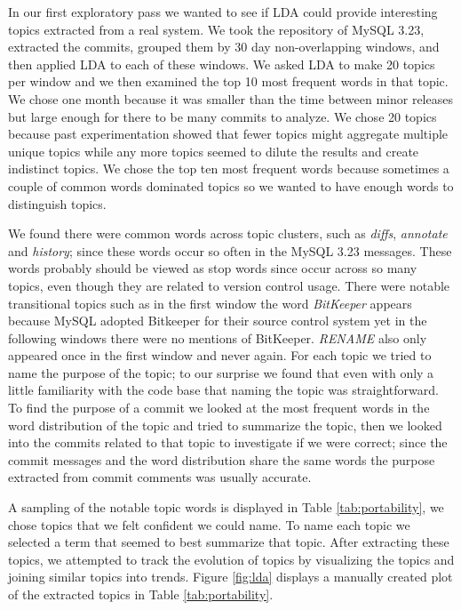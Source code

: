 \documentclass[times, 10pt,twocolumn]{article}
\newcommand{\shrinkit}{\vspace*{-.3em}}
\begin{document}

\shrinkit
{}
\shrinkit

In our first exploratory pass we wanted to see if LDA could provide
interesting topics extracted from a real system. We took the
repository of MySQL 3.23, extracted the commits, grouped them by 30
day non-overlapping windows, and then applied LDA to each of these
windows. We asked LDA to make 20 topics per window and we then
examined the top 10 most frequent words in that topic.  We chose one
month because it was smaller than the time between minor releases but
large enough for there to be many commits to analyze. We chose 20
topics because past experimentation showed that fewer topics might
aggregate multiple unique topics while any more topics seemed to dilute
the results and create indistinct topics. 
  We chose the top ten most frequent words because sometimes a couple
  of common words dominated topics so we wanted to have enough words
  to distinguish topics.

We found there were common words across topic clusters, such as
\emph{diffs}, \emph{annotate} and \emph{history}; since these words
occur so often in the MySQL 3.23 messages. These words probably should
be viewed as stop words since occur across so many topics, even though
they are related to version control usage.  There were notable
transitional topics such as in the first window the word
\emph{BitKeeper} appears because MySQL adopted Bitkeeper for their
source control system yet in the following windows there were no
mentions of BitKeeper. \emph{RENAME} also only appeared once in the
first window and never again. For each topic we tried to name the
purpose of the topic; to our surprise we found that even with only a
little familiarity with the code base that naming the topic was
straightforward. To find the purpose of a commit we looked at the most
frequent words in the word distribution of the topic and tried to
summarize the topic, then we looked into the commits related to that
topic to investigate if we were correct; since the commit messages and
the word distribution share the same words the purpose extracted from
commit comments was usually accurate.


A sampling of the notable topic words is displayed in Table
\ref{tab:portability}, we chose topics that we felt confident we could
name.  To name each topic we selected a term that seemed to best
summarize that topic.  After extracting these topics, we attempted to
track the evolution of topics by visualizing the topics and joining
similar topics into trends.  Figure \ref{fig:lda} displays a manually
created plot of the extracted topics in Table
\ref{tab:portability}.
\end{document}
